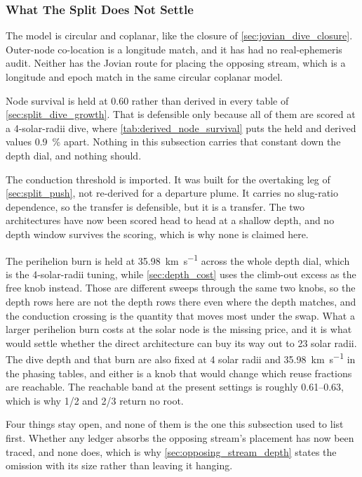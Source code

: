 \documentclass{article}
\begin{document}
\subsubsection{What The Split Does Not Settle}\label{sec:split_dive_open}
The model is circular and coplanar, like the closure of \autoref{sec:jovian_dive_closure}. Outer-node co-location is a longitude match, and it has had no real-ephemeris audit. Neither has the Jovian route for placing the opposing stream, which is a longitude and epoch match in the same circular coplanar model.

Node survival is held at \num{0.60} rather than derived in every table of \autoref{sec:split_dive_growth}. That is defensible only because all of them are scored at a 4-solar-radii dive, where \autoref{tab:derived_node_survival} puts the held and derived values \SI{0.9}{\percent} apart. Nothing in this subsection carries that constant down the depth dial, and nothing should.

The conduction threshold is imported. It was built for the overtaking leg of \autoref{sec:split_push}, not re-derived for a departure plume. It carries no slug-ratio dependence, so the transfer is defensible, but it is a transfer. The two architectures have now been scored head to head at a shallow depth, and no depth window survives the scoring, which is why none is claimed here.

The perihelion burn is held at \SI{35.98}{\kilo\meter\per\second} across the whole depth dial, which is the 4-solar-radii tuning, while \autoref{sec:depth_cost} uses the climb-out excess as the free knob instead. Those are different sweeps through the same two knobs, so the depth rows here are not the depth rows there even where the depth matches, and the conduction crossing is the quantity that moves most under the swap. What a larger perihelion burn costs at the solar node is the missing price, and it is what would settle whether the direct architecture can buy its way out to 23 solar radii. The dive depth and that burn are also fixed at 4 solar radii and \SI{35.98}{\kilo\meter\per\second} in the phasing tables, and either is a knob that would change which reuse fractions are reachable. The reachable band at the present settings is roughly \numrange{0.61}{0.63}, which is why 1/2 and 2/3 return no root.

Four things stay open, and none of them is the one this subsection used to list first. Whether any ledger absorbs the opposing stream's placement has now been traced, and none does, which is why \autoref{sec:opposing_stream_depth} states the omission with its size rather than leaving it hanging.
\end{document}
